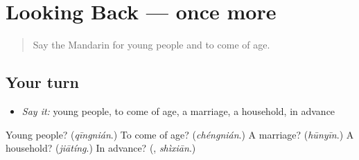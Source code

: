 \section[(dialogue)]{Looking Back — once more}

\label{lesson:ZH-R317-review-final-317}



\begin{quote}
Say the Mandarin for young people and to come of age.
\end{quote}

\subsection*{Your turn}
\begin{itemize}
\raggedright
  \item \emph{Say it:} young people, to come of age, a marriage, a household, in advance
\end{itemize}

\begin{tcolorbox}[breakable,colback=teal!4,colframe=teal!35!black,title={Before you move on}]
Young people? (\emph{qīngnián}.) To come of age? (\emph{chéngnián}.) A marriage? (\emph{hūnyīn}.) A household? (\emph{jiātíng}.) In advance? (\textbf{}, \emph{shìxiān}.)
\end{tcolorbox}
